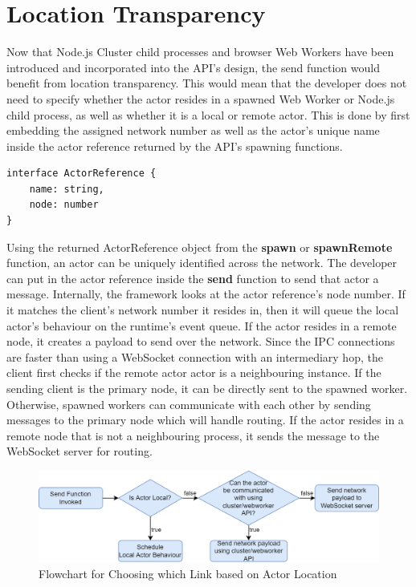 \documentclass[oneside]{um-fict}
\begin{document}
\section{Location Transparency}
Now that Node.js Cluster child processes and browser Web Workers have been introduced and incorporated into the API's design, the send function would benefit from location transparency. This would mean that the developer does not need to specify whether the actor resides in a spawned Web Worker or Node.js child process, as well as whether it is a local or remote actor. This is done by first embedding the assigned network number as well as the actor's unique name inside the actor reference returned by the API's spawning functions.
\begin{lstlisting}
interface ActorReference {
    name: string,
    node: number
}
\end{lstlisting}
Using the returned ActorReference object from the \textbf{spawn} or \textbf{spawnRemote} function, an actor can be uniquely identified across the network. The developer can put in the actor reference inside the \textbf{send} function to send that actor a message. Internally, the framework looks at the actor reference's node number. If it matches the client's network number it resides in, then it will queue the local actor's behaviour on the runtime's event queue. If the actor resides in a remote node, it creates a payload to send over the network. Since the IPC connections are faster than using a WebSocket connection with an intermediary hop, the client first checks if the remote actor actor is a neighbouring instance. If the sending client is the primary node, it can be directly sent to the spawned worker. Otherwise, spawned workers can communicate with each other by sending messages to the primary node which will handle routing. If the actor resides in a remote node that is not a neighbouring process, it sends the message to the WebSocket server for routing.
\begin{figure}[H]
    \begin{centering}
        \includegraphics[width=\textwidth]{resources/communication.png}
        \caption{Flowchart for Choosing which Link based on Actor Location}\label{fig:communication}
    \end{centering}
\end{figure}
\end{document}
